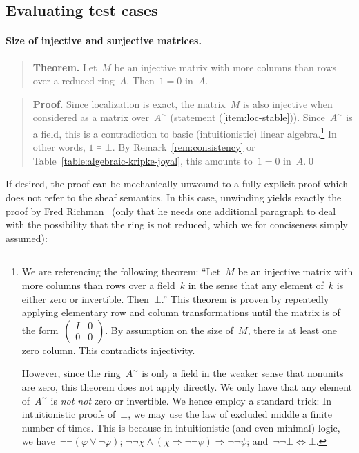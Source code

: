\documentclass{ws-rv9x6}
\renewcommand{\_}{\mathpunct{.}}
\newcommand{\?}{\,{:}\,}
\begin{document}
\subsection{Evaluating test cases}
\label{sect:example-applications}

\paragraph{Size of injective and surjective matrices.}

\begin{quote}
\textbf{Theorem.} Let~$M$ be an injective matrix with more columns than rows
over a reduced ring~$A$. Then~$1 = 0$ in~$A$.
\end{quote}

\begin{quote}
\textbf{Proof.} Since localization is exact, the matrix~$M$ is also injective when
considered as a matrix over~$A^\sim$ (statement (\ref{item:loc-stable})).
Since~$A^\sim$ is a field, this is a contradiction to basic (intuitionistic)
linear algebra.\footnote{We are referencing the following theorem: ``Let~$M$ be
an injective matrix with more columns than rows over a field~$k$ in the sense
that any element of~$k$ is either zero or invertible. Then~$\bot$.'' This
theorem is proven by repeatedly applying elementary row and column
transformations until the matrix is of the
form~$\left(\begin{smallmatrix}I&0\\0&0\end{smallmatrix}\right)$. By assumption
on the size of~$M$, there is at least one zero column. This contradicts
injectivity.

However, since the ring~$A^\sim$ is only a field in the weaker sense that
nonunits are zero, this theorem does not apply directly. We only have that any
element of~$A^\sim$ is \emph{not not} zero or invertible. We hence employ a
standard trick: In intuitionistic proofs of~$\bot$, we may use the law of
excluded middle a finite number of times. This is because in intuitionistic
(and even minimal) logic, we have~$\neg\neg(\varphi \vee \neg\varphi)$;
$\neg\neg\chi \wedge (\chi \Rightarrow \neg\neg\psi) \Longrightarrow
\neg\neg\psi$; and~$\neg\neg\bot \Leftrightarrow \bot$.}
In other words, $1 \models \bot$. By
Remark~\ref{rem:consistency} or Table~\ref{table:algebraic-kripke-joyal}, this amounts to~$1 = 0$ in~$A$.\qed
\end{quote}

If desired, the proof can be mechanically unwound to a fully explicit proof
which does not refer to the sheaf semantics. In this case, unwinding yields
exactly the proof by Fred Richman~\cite[Theorem~2]{richman:trivial-rings} (only
that he needs one additional paragraph to deal with the possibility that the
ring is not reduced, which we for conciseness simply assumed):
\end{document}
